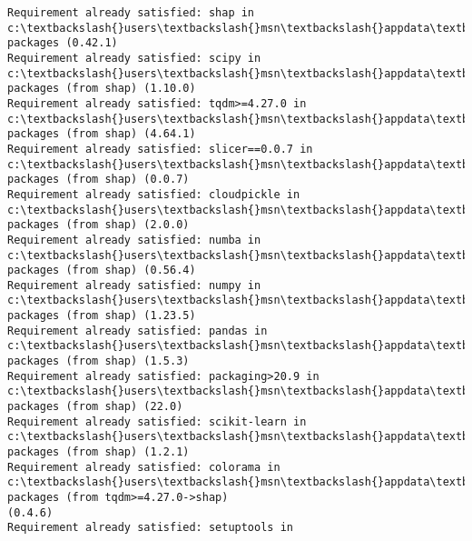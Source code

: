 \documentclass[11pt]{article}
\begin{document}
    \begin{Verbatim}[commandchars=\\\{\}]
Requirement already satisfied: shap in
c:\textbackslash{}users\textbackslash{}msn\textbackslash{}appdata\textbackslash{}local\textbackslash{}anaconda3\textbackslash{}lib\textbackslash{}site-packages (0.42.1)
Requirement already satisfied: scipy in
c:\textbackslash{}users\textbackslash{}msn\textbackslash{}appdata\textbackslash{}local\textbackslash{}anaconda3\textbackslash{}lib\textbackslash{}site-packages (from shap) (1.10.0)
Requirement already satisfied: tqdm>=4.27.0 in
c:\textbackslash{}users\textbackslash{}msn\textbackslash{}appdata\textbackslash{}local\textbackslash{}anaconda3\textbackslash{}lib\textbackslash{}site-packages (from shap) (4.64.1)
Requirement already satisfied: slicer==0.0.7 in
c:\textbackslash{}users\textbackslash{}msn\textbackslash{}appdata\textbackslash{}local\textbackslash{}anaconda3\textbackslash{}lib\textbackslash{}site-packages (from shap) (0.0.7)
Requirement already satisfied: cloudpickle in
c:\textbackslash{}users\textbackslash{}msn\textbackslash{}appdata\textbackslash{}local\textbackslash{}anaconda3\textbackslash{}lib\textbackslash{}site-packages (from shap) (2.0.0)
Requirement already satisfied: numba in
c:\textbackslash{}users\textbackslash{}msn\textbackslash{}appdata\textbackslash{}local\textbackslash{}anaconda3\textbackslash{}lib\textbackslash{}site-packages (from shap) (0.56.4)
Requirement already satisfied: numpy in
c:\textbackslash{}users\textbackslash{}msn\textbackslash{}appdata\textbackslash{}local\textbackslash{}anaconda3\textbackslash{}lib\textbackslash{}site-packages (from shap) (1.23.5)
Requirement already satisfied: pandas in
c:\textbackslash{}users\textbackslash{}msn\textbackslash{}appdata\textbackslash{}local\textbackslash{}anaconda3\textbackslash{}lib\textbackslash{}site-packages (from shap) (1.5.3)
Requirement already satisfied: packaging>20.9 in
c:\textbackslash{}users\textbackslash{}msn\textbackslash{}appdata\textbackslash{}local\textbackslash{}anaconda3\textbackslash{}lib\textbackslash{}site-packages (from shap) (22.0)
Requirement already satisfied: scikit-learn in
c:\textbackslash{}users\textbackslash{}msn\textbackslash{}appdata\textbackslash{}local\textbackslash{}anaconda3\textbackslash{}lib\textbackslash{}site-packages (from shap) (1.2.1)
Requirement already satisfied: colorama in
c:\textbackslash{}users\textbackslash{}msn\textbackslash{}appdata\textbackslash{}local\textbackslash{}anaconda3\textbackslash{}lib\textbackslash{}site-packages (from tqdm>=4.27.0->shap)
(0.4.6)
Requirement already satisfied: setuptools in

\end{Verbatim}
\end{document}
